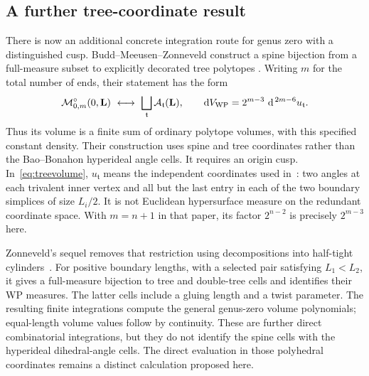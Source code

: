 \subsection{A further tree-coordinate result}

There is now an additional concrete integration route for genus zero with
a distinguished cusp. Budd--Meeusen--Zonneveld construct a spine bijection
from a full-measure subset to explicitly decorated tree polytopes
\cite[Theorem 1]{BMZ}. Writing $m$ for the total number of ends, their
statement has the form
\begin{equation}
 \M_{0,m}^{\circ}(0,\lengths)\ \longleftrightarrow\
 \bigsqcup_{\mathfrak t}\mathcal A_{\mathfrak t}(\lengths),
 \qquad
 \dV=2^{m-3}\,\dd^{\,2m-6}u_{\mathfrak t}.
 \label{eq:treevolume}
\end{equation}
Thus its volume is a finite sum of ordinary polytope volumes, with this
specified constant density. Their construction uses spine and tree
coordinates rather than the Bao--Bonahon hyperideal angle cells. It
requires an origin cusp.
In~\eqref{eq:treevolume}, $u_{\mathfrak t}$ means the independent coordinates
used in~\cite[equation (5)]{BMZ}: two angles at each trivalent inner
vertex and all but the last entry in each of the two boundary simplices
of size $L_i/2$. It is not Euclidean hypersurface measure on the redundant
coordinate space. With $m=n+1$ in that paper, its factor $2^{n-2}$ is
precisely $2^{m-3}$ here.

Zonneveld's sequel removes that restriction using decompositions into
half-tight cylinders~\cite[Theorem 3]{Zonneveld}. For positive boundary
lengths, with a selected pair satisfying $L_1<L_2$, it gives a full-measure
bijection to tree and double-tree cells and identifies their WP measures.
The latter cells include a gluing length and a twist parameter. The resulting
finite integrations compute the general genus-zero volume polynomials;
equal-length volume values follow by continuity. These are further direct
combinatorial integrations, but they do not identify the spine cells with
the hyperideal dihedral-angle cells. The direct evaluation in those
polyhedral coordinates remains a distinct calculation proposed here.

